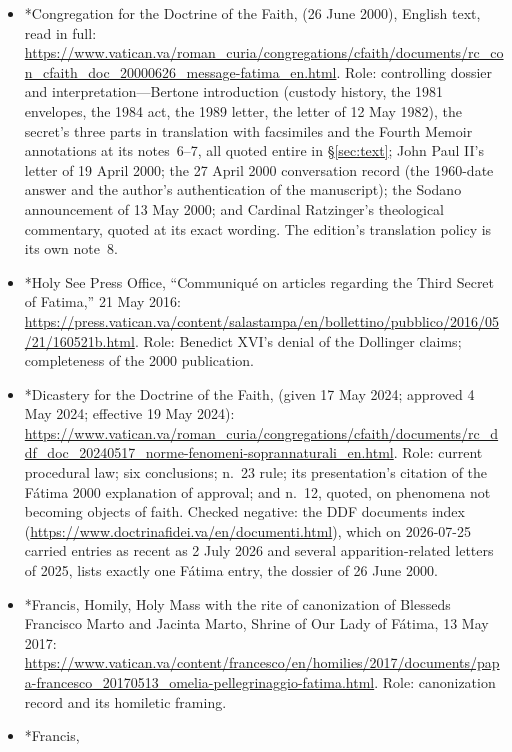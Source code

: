 \begin{itemize}
\item *Congregation for the Doctrine of the Faith,  (26 June 2000), English text, read in full:
\url{https://www.vatican.va/roman_curia/congregations/cfaith/documents/rc_con_cfaith_doc_20000626_message-fatima_en.html}.
Role: controlling dossier and interpretation---Bertone introduction
(custody history, the 1981 envelopes, the 1984 act, the 1989 letter,
the letter of 12 May 1982), the secret's three parts in translation
with facsimiles and the Fourth Memoir annotations at its notes~6--7,
all quoted entire in \S\ref{sec:text}; John Paul II's letter of
19 April 2000; the 27 April 2000 conversation record (the 1960-date
answer and the author's authentication of the manuscript); the
Sodano announcement of 13 May 2000; and Cardinal Ratzinger's
theological commentary, quoted at its exact wording. The edition's
translation policy is its own note~8.
\item *Holy See Press Office, ``Communiqu\'e on articles regarding
the Third Secret of Fatima,'' 21 May 2016:
\url{https://press.vatican.va/content/salastampa/en/bollettino/pubblico/2016/05/21/160521b.html}.
Role: Benedict XVI's denial of the Dollinger claims; completeness of
the 2000 publication.
\item *Dicastery for the Doctrine of the Faith, 
(given 17 May 2024; approved 4 May 2024; effective 19 May 2024):
\url{https://www.vatican.va/roman_curia/congregations/cfaith/documents/rc_ddf_doc_20240517_norme-fenomeni-soprannaturali_en.html}.
Role: current procedural law; six conclusions; n.~23 rule; its
presentation's citation of the F\'atima 2000 explanation of
approval; and n.~12, quoted, on phenomena not becoming objects of
faith. Checked negative: the DDF documents index
(\url{https://www.doctrinafidei.va/en/documenti.html}), which on
2026-07-25 carried entries as recent as 2 July 2026 and several
apparition-related letters of 2025, lists exactly one F\'atima entry,
the dossier of 26 June 2000.
\item *Francis, Homily, Holy Mass with the rite of canonization of
Blesseds Francisco Marto and Jacinta Marto, Shrine of Our Lady of
F\'atima, 13 May 2017:
\url{https://www.vatican.va/content/francesco/en/homilies/2017/documents/papa-francesco_20170513_omelia-pellegrinaggio-fatima.html}.
Role: canonization record and its homiletic framing.
\item *Francis, 
\end{itemize}
